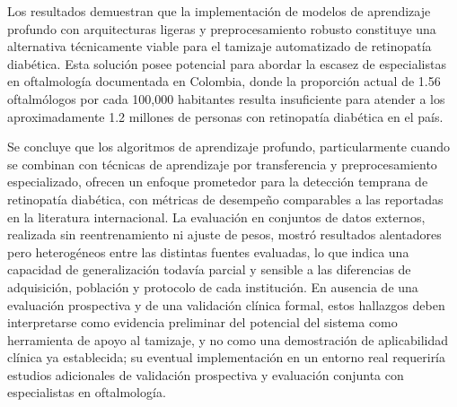 Los resultados demuestran que la implementación de modelos de aprendizaje profundo con
arquitecturas ligeras y preprocesamiento robusto constituye una alternativa técnicamente
viable para el tamizaje automatizado de retinopatía diabética. Esta solución posee
potencial para abordar la escasez de especialistas en oftalmología documentada en
Colombia, donde la proporción actual de 1.56 oftalmólogos por cada 100{,}000 habitantes
resulta insuficiente para atender a los aproximadamente 1.2 millones de personas con
retinopatía diabética en el país.

Se concluye que los algoritmos de aprendizaje profundo, particularmente cuando se combinan
con técnicas de aprendizaje por transferencia y preprocesamiento especializado, ofrecen un
enfoque prometedor para la detección temprana de retinopatía diabética, con métricas de
desempeño comparables a las reportadas en la literatura internacional. La evaluación en
conjuntos de datos externos, realizada sin reentrenamiento ni ajuste de pesos, mostró
resultados alentadores pero heterogéneos entre las distintas fuentes evaluadas, lo que
indica una capacidad de generalización todavía parcial y sensible a las diferencias de
adquisición, población y protocolo de cada institución. En ausencia de una evaluación
prospectiva y de una validación clínica formal, estos hallazgos deben interpretarse como
evidencia preliminar del potencial del sistema como herramienta de apoyo al tamizaje, y no
como una demostración de aplicabilidad clínica ya establecida; su eventual implementación
en un entorno real requeriría estudios adicionales de validación prospectiva y evaluación
conjunta con especialistas en oftalmología.
